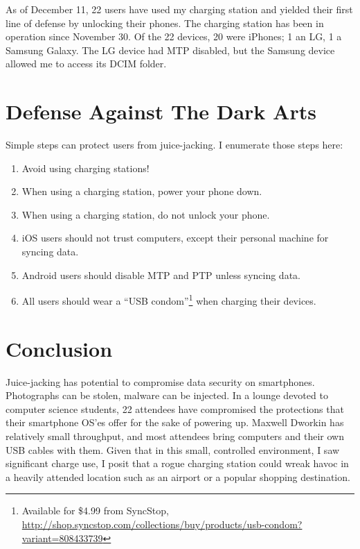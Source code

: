 \documentclass[11pt]{article} %
\begin{document}
As of December 11, 22 users have used my charging station and yielded their first line of defense by unlocking their phones. The charging station has been in operation since November 30. Of the 22 devices, 20 were iPhones; 1 an LG, 1 a Samsung Galaxy. The LG device had MTP disabled, but the Samsung device allowed me to access its DCIM folder. 

\section{Defense Against The Dark Arts}

Simple steps can protect users from juice-jacking. I enumerate those steps here: 

\begin{enumerate}
\item Avoid using charging stations! 
\item When using a charging station, power your phone down. 
\item When using a charging station, do not unlock your phone. 
\item iOS users should not trust computers, except their personal machine for syncing data. 
\item Android users should disable MTP and PTP unless syncing data. 
\item All users should wear a ``USB condom''\footnote{Available for \$4.99 from SyncStop, \url{http://shop.syncstop.com/collections/buy/products/usb-condom?variant=808433739}} when charging their devices. 

\end{enumerate}

\section{Conclusion}

Juice-jacking has potential to compromise data security on smartphones. Photographs can be stolen, malware can be injected. In a lounge devoted to computer science students, 22 attendees have compromised the protections that their smartphone OS'es offer for the sake of powering up. Maxwell Dworkin has relatively small throughput, and most attendees bring computers and their own USB cables with them. Given that in this small, controlled environment, I saw significant charge use, I posit that a rogue charging station could wreak havoc in a heavily attended location such as an airport or a popular shopping destination. 
\end{document}
